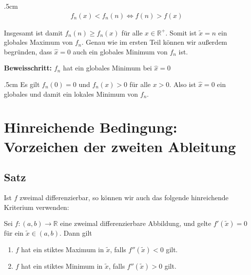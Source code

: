 \documentclass[fontsize=9pt,
               parskip=half-,
               DIV=14,
               listof=chapterentry,
               tocflat]{scrbook}
\newenvironment{indentblock}{\begin{adjustwidth}{.5cm}{}}{\end{adjustwidth}}
\newcommand{\proofstep}[1]{\textbf{\textcolor{sblau}{#1}}}
\begin{document}
\begin{solution*}
\begin{indentblock}
\begin{align*}
f_{n}(x)<f_{n}(n)\iff f(n)>f(x)
\end{align*}

Insgesamt ist damit $f_{n}(n)\geq f_{n}(x)$ für alle $x\in \mathbb {R} ^{+}$. Somit ist ${\tilde {x}}=n$ ein globales Maximum von $f_{n}$. Genau wie im ersten Teil können wir außerdem begründen, dass ${\hat {x}}=0$ auch ein globales Minimum von $f_{n}$ ist.

\end{indentblock}

\proofstep{Beweisschritt:}
 $f_{n}$ hat ein globales Minimum bei ${\hat {x}}=0$\begin{indentblock}
Es gilt $f_{n}(0)=0$ und $f_{n}(x)>0$ für alle $x>0$. Also ist ${\hat {x}}=0$ ein globales und damit ein lokales Minimum von $f_{n}$.

\end{indentblock}

\end{solution*}

\section{Hinreichende Bedingung: Vorzeichen der zweiten Ableitung}

\subsection{Satz}

Ist $f$ zweimal differenzierbar, so können wir auch das folgende hinreichende Kriterium verwenden:

\begin{theorem*}
Sei $f:(a,b)\to \mathbb {R} $ eine zweimal differenzierbare Abbildung, und gelte $f'({\tilde {x}})=0$ für ein ${\tilde {x}}\in (a,b)$. Dann gilt

\begin{enumerate}
\item $f$ hat ein stiktes Maximum in ${\tilde {x}}$, falls $f''({\tilde {x}})<0$ gilt.
\item $f$ hat ein stiktes Minimum in ${\tilde {x}}$, falls $f''({\tilde {x}})>0$ gilt.
\end{enumerate}

\end{theorem*}
\end{document}
